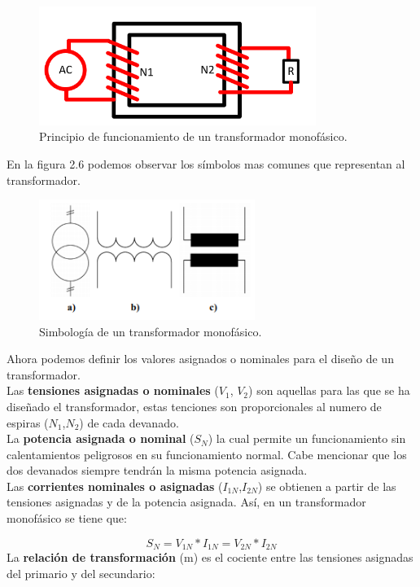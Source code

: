 \begin{figure}[H]
\centering
\includegraphics[width=9cm]{capitulo3/figs/trans.png}
\caption{ Principio de funcionamiento de un transformador monofásico. \cite{transformador}}
\end{figure}

En la figura 2.6 podemos observar los símbolos mas comunes que representan al transformador. 

\begin{figure}[H]
\centering
\includegraphics[width=7cm]{capitulo3/figs/simbolos.png}
\caption{ Simbología de un transformador monofásico.}
\end{figure}

Ahora podemos definir los valores asignados o nominales para el diseño de un transformador.\\

Las \textbf{tensiones asignadas o nominales} ($V_{1}$, $V_{2}$) son aquellas para las que se ha diseñado el transformador, estas tenciones son proporcionales al numero de espiras ($N_{1}$,$N_{2}$) de cada devanado.\\

La \textbf{potencia asignada o nominal} ($S_{N}$) la cual permite un funcionamiento sin calentamientos peligrosos en su funcionamiento normal. Cabe mencionar que los dos devanados siempre tendrán la misma potencia asignada.\\

Las \textbf{corrientes nominales o asignadas} ($I_{1N}$,$I_{2N}$) se obtienen a partir de las tensiones asignadas y de la potencia asignada. Así, en un transformador monofásico se tiene que:

\begin{equation}\label{eq:ej}
S_{N}=V_{1N}*I_{1N}=V_{2N}*I_{2N}
\end{equation}
La \textbf{relación de transformación} (m) es el cociente entre las tensiones asignadas del primario y del secundario: 

